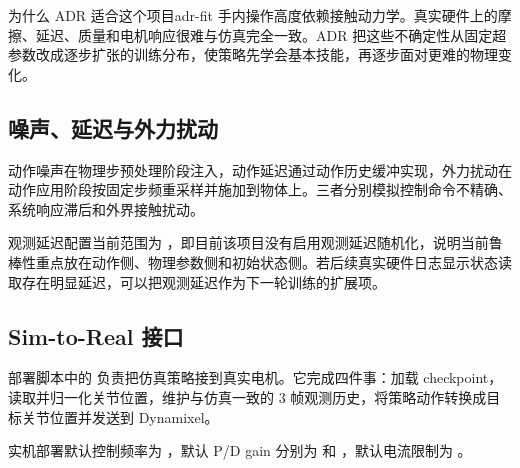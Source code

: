 \begin{example}{为什么 ADR 适合这个项目}{adr-fit}
手内操作高度依赖接触动力学。真实硬件上的摩擦、延迟、质量和电机响应很难与仿真完全一致。ADR 把这些不确定性从固定超参数改成逐步扩张的训练分布，使策略先学会基本技能，再逐步面对更难的物理变化。
\end{example}

\subsection{噪声、延迟与外力扰动}

动作噪声在物理步预处理阶段注入，动作延迟通过动作历史缓冲实现，外力扰动在动作应用阶段按固定步频重采样并施加到物体上。三者分别模拟控制命令不精确、系统响应滞后和外界接触扰动。

观测延迟配置当前范围为 ，即目前该项目没有启用观测延迟随机化，说明当前鲁棒性重点放在动作侧、物理参数侧和初始状态侧。若后续真实硬件日志显示状态读取存在明显延迟，可以把观测延迟作为下一轮训练的扩展项。

\subsection{Sim-to-Real 接口}

部署脚本中的  负责把仿真策略接到真实电机。它完成四件事：加载  checkpoint，读取并归一化关节位置，维护与仿真一致的 3 帧观测历史，将策略动作转换成目标关节位置并发送到 Dynamixel。

实机部署默认控制频率为 ，默认 P/D gain 分别为  和 ，默认电流限制为 。
